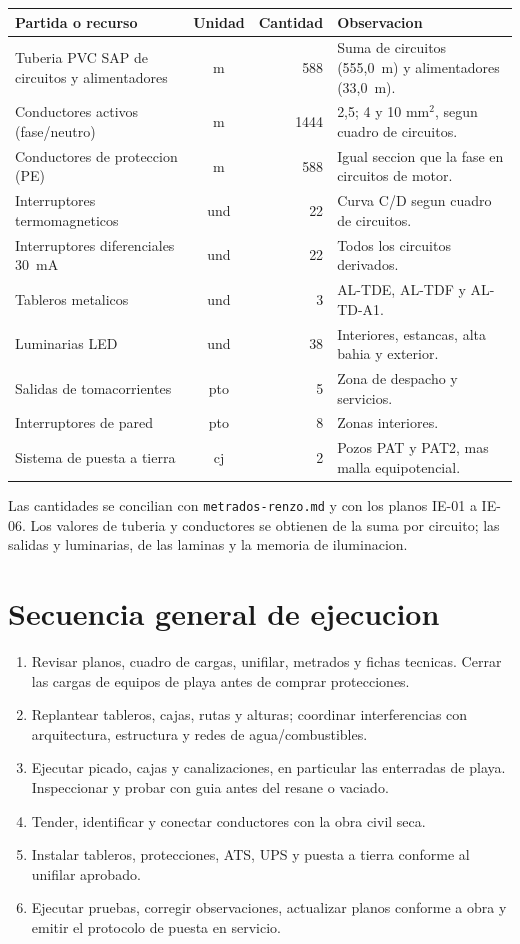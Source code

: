 \begin{center}
\small
\begin{tabularx}{\linewidth}{L c r X}
\toprule
\textbf{Partida o recurso} & \textbf{Unidad} & \textbf{Cantidad} & \textbf{Observacion} \\
\midrule
Tuberia PVC SAP de circuitos y alimentadores & m & 588 & Suma de circuitos (555,0~m) y alimentadores (33,0~m). \\
Conductores activos (fase/neutro) & m & 1444 & 2,5; 4 y 10 mm\(^2\), segun cuadro de circuitos. \\
Conductores de proteccion (PE) & m & 588 & Igual seccion que la fase en circuitos de motor. \\
Interruptores termomagneticos & und & 22 & Curva C/D segun cuadro de circuitos. \\
Interruptores diferenciales 30~mA & und & 22 & Todos los circuitos derivados. \\
Tableros metalicos & und & 3 & AL-TDE, AL-TDF y AL-TD-A1. \\
Luminarias LED & und & 38 & Interiores, estancas, alta bahia y exterior. \\
Salidas de tomacorrientes & pto & 5 & Zona de despacho y servicios. \\
Interruptores de pared & pto & 8 & Zonas interiores. \\
Sistema de puesta a tierra & cj & 2 & Pozos PAT y PAT2, mas malla equipotencial. \\
\bottomrule
\end{tabularx}
\end{center}

Las cantidades se concilian con \texttt{metrados-renzo.md} y con los planos
IE-01 a IE-06. Los valores de tuberia y conductores se obtienen de la suma por
circuito; las salidas y luminarias, de las laminas y la memoria de iluminacion.

\section{Secuencia general de ejecucion}

\begin{enumerate}
  \item Revisar planos, cuadro de cargas, unifilar, metrados y fichas tecnicas.
  Cerrar las cargas de equipos de playa antes de comprar protecciones.
  \item Replantear tableros, cajas, rutas y alturas; coordinar interferencias
  con arquitectura, estructura y redes de agua/combustibles.
  \item Ejecutar picado, cajas y canalizaciones, en particular las enterradas
  de playa. Inspeccionar y probar con guia antes del resane o vaciado.
  \item Tender, identificar y conectar conductores con la obra civil seca.
  \item Instalar tableros, protecciones, ATS, UPS y puesta a tierra conforme al
  unifilar aprobado.
  \item Ejecutar pruebas, corregir observaciones, actualizar planos conforme a
  obra y emitir el protocolo de puesta en servicio.
\end{enumerate}

